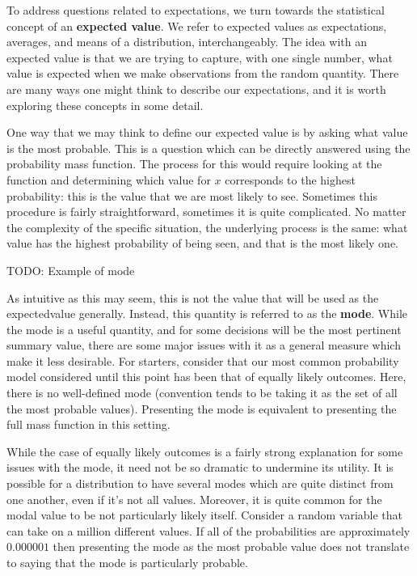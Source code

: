 \documentclass[
  letterpaper,
  DIV=11,
  numbers=noendperiod]{scrreprt}
\begin{document}
To address questions related to expectations, we turn towards the
statistical concept of an \textbf{expected value}. We refer to expected
values as expectations, averages, and means of a distribution,
interchangeably. The idea with an expected value is that we are trying
to capture, with one single number, what value is expected when we make
observations from the random quantity. There are many ways one might
think to describe our expectations, and it is worth exploring these
concepts in some detail.

One way that we may think to define our expected value is by asking what
value is the most probable. This is a question which can be directly
answered using the probability mass function. The process for this would
require looking at the function and determining which value for \(x\)
corresponds to the highest probability: this is the value that we are
most likely to see. Sometimes this procedure is fairly straightforward,
sometimes it is quite complicated. No matter the complexity of the
specific situation, the underlying process is the same: what value has
the highest probability of being seen, and that is the most likely one.

TODO: Example of mode

As intuitive as this may seem, this is not the value that will be used
as the expectedvalue generally. Instead, this quantity is referred to as
the \textbf{mode}. While the mode is a useful quantity, and for some
decisions will be the most pertinent summary value, there are some major
issues with it as a general measure which make it less desirable. For
starters, consider that our most common probability model considered
until this point has been that of equally likely outcomes. Here, there
is no well-defined mode (convention tends to be taking it as the set of
all the most probable values). Presenting the mode is equivalent to
presenting the full mass function in this setting.

While the case of equally likely outcomes is a fairly strong explanation
for some issues with the mode, it need not be so dramatic to undermine
its utility. It is possible for a distribution to have several modes
which are quite distinct from one another, even if it's not all values.
Moreover, it is quite common for the modal value to be not particularly
likely itself. Consider a random variable that can take on a million
different values. If all of the probabilities are approximately
\(0.000001\) then presenting the mode as the most probable value does
not translate to saying that the mode is particularly probable.
\end{document}
